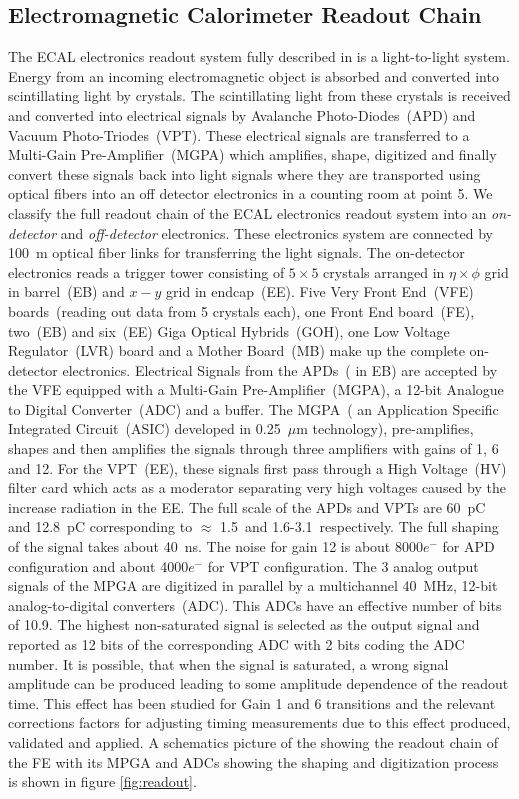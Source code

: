 \subsection{Electromagnetic Calorimeter Readout Chain}
The ECAL electronics readout system fully described in \cite{ECALREADOUT} is a light-to-light system. Energy from an incoming electromagnetic object is absorbed and converted into scintillating light by \pb crystals. The scintillating light from these crystals is received and converted into electrical signals by Avalanche Photo-Diodes~(APD) and Vacuum Photo-Triodes~(VPT). These electrical signals are transferred to a Multi-Gain Pre-Amplifier~(MGPA) which amplifies, shape,  digitized and finally convert these signals back into light signals where they are transported using optical fibers into an off detector electronics in a counting room at point 5. We classify the full readout chain of the ECAL electronics readout system into an \textit{on-detector} and \textit{off-detector} electronics. These electronics system are connected by 100~m optical fiber links for transferring the light signals. 
The on-detector electronics reads a trigger tower consisting of $5\times5$ crystals arranged in $\eta \times \phi$ grid in barrel~(EB) and $x-y$ grid in endcap~(EE). Five Very Front End~(VFE) boards~(reading out data from 5 crystals each), one Front End board~(FE), two~(EB) and six~(EE) Giga Optical Hybrids~(GOH), one Low Voltage Regulator~(LVR) board and a Mother Board~(MB) make up the complete on-detector electronics. Electrical Signals from the APDs~( in EB) are accepted by the VFE equipped with a Multi-Gain Pre-Amplifier~(MGPA), a 12-bit Analogue to Digital Converter~(ADC) and a buffer. The MGPA~( an Application Specific Integrated Circuit~(ASIC) developed in 0.25~$\mu$m technology), pre-amplifies, shapes and then amplifies the signals through three amplifiers with gains of 1, 6 and 12. For the VPT~(EE), these signals first pass through a High Voltage~(HV) filter card which acts as a moderator separating very high voltages caused by the increase radiation in the EE. The full scale of the APDs and VPTs are 60~pC and 12.8~pC corresponding to $\approx$ 1.5~\TeV and 1.6-3.1~\TeV respectively. The full shaping of the signal takes about 40~ns. The noise for gain 12 is about 8000$e^{-}$ for APD configuration and about 4000$e^{-}$ for VPT configuration. 
The 3 analog output signals of the MPGA are digitized in parallel by a multichannel 40~MHz, 12-bit analog-to-digital converters~(ADC). This ADCs have an effective number of bits of 10.9. The highest non-saturated signal is selected as the output signal and reported as 12 bits of the corresponding ADC with 2 bits coding the ADC number. It is possible, that when the signal is saturated, a wrong signal amplitude can be produced leading to some amplitude dependence of the readout time. This effect has been studied for Gain 1 and 6 transitions and the relevant corrections factors for adjusting timing measurements due to this effect produced, validated and applied.
A schematics picture of the showing the readout chain of the FE with its MPGA and ADCs showing the shaping and digitization process is shown in figure \ref{fig:readout}.

